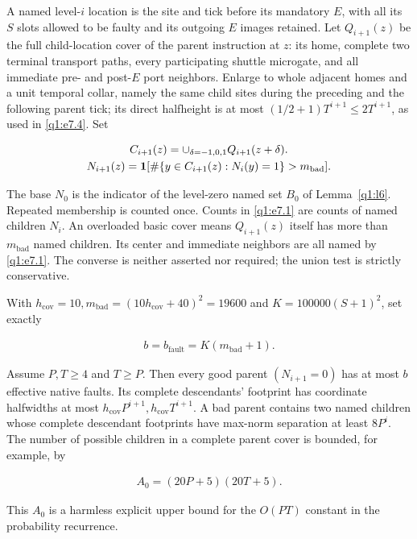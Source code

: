 \begin{lemma}\label{q1:l7}


A named level-\(i\) location is the site and tick before its mandatory \(E\), with all its \(S\) slots allowed to be faulty and its outgoing \(E\) images retained. Let \(Q_{i+1}(z)\) be the full child-location cover of the parent instruction at \(z\): its home, complete two terminal transport paths, every participating shuttle microgate, and all immediate pre- and post-\(E\) port neighbors. Enlarge to whole adjacent homes and a unit temporal collar, namely the same child sites during the preceding and the following parent tick; its direct halfheight is at most \((1/2+1)T^{i+1} \le  2T^{i+1}\), as used in \eqref{q1:e7.4}. Set

\begin{equation}\label{q1:e7.1}
\begin{gathered}
C_{i+1}(z) = \cup _{\delta=-1,0,1} Q_{i+1}(z+\delta). \\ N_{i+1}(z) = \mathbf 1[ \#\{y \in  C_{i+1}(z): N_{i}(y)=1\} > m_{\mathrm{bad}} ].
\end{gathered}
\end{equation}

The base \(N_{0}\) is the indicator of the level-zero named set \(B_{0}\) of Lemma~\ref{q1:l6}. Repeated membership is counted once. Counts in \eqref{q1:e7.1} are counts of named children \(N_{i}\). An overloaded basic cover means \(Q_{i+1}(z)\) itself has more than \(m_{\mathrm{bad}}\) named children. Its center and immediate neighbors are all named by \eqref{q1:e7.1}. The converse is neither asserted nor required; the union test is strictly conservative.

With \(h_{\mathrm{cov}}=10, m_{\mathrm{bad}}=(10h_{\mathrm{cov}}+40)^{2}=19600\) and \(K=100000(S+1)^{2}\), set exactly

\begin{equation}\label{q1:e7.2}
\begin{gathered}
b=b_{\mathrm{fault}}=K(m_{\mathrm{bad}}+1).
\end{gathered}
\end{equation}

Assume \(P,T\ge 4\) and \(T\ge P\). Then every good parent \((N_{i+1}=0)\) has at most \(b\) effective native faults. Its complete descendants' footprint has coordinate halfwidths at most \(h_{\mathrm{cov}} P^{i+1}, h_{\mathrm{cov}} T^{i+1}\). A bad parent contains two named children whose complete descendant footprints have max-norm separation at least \(8P^{i}\). The number of possible children in a complete parent cover is bounded, for example, by

\begin{equation}\label{q1:e7.3}
\begin{gathered}
A_0=(20P+5)(20T+5).
\end{gathered}
\end{equation}

This \(A_0\) is a harmless explicit upper bound for the \(O(PT)\) constant in the probability recurrence.

\end{lemma}
